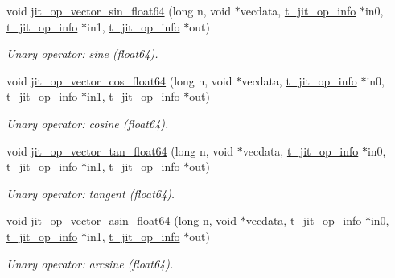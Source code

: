 \begin{DoxyCompactItemize}
void \hyperlink{group__opvecmod_ga12fa0c0f124217b6703c6f02bccee9d2}{jit\_\-op\_\-vector\_\-sin\_\-float64} (long n, void $\ast$vecdata, \hyperlink{structt__jit__op__info}{t\_\-jit\_\-op\_\-info} $\ast$in0, \hyperlink{structt__jit__op__info}{t\_\-jit\_\-op\_\-info} $\ast$in1, \hyperlink{structt__jit__op__info}{t\_\-jit\_\-op\_\-info} $\ast$out)
\begin{DoxyCompactList}\small\item\em Unary operator: sine (float64). \item\end{DoxyCompactList}\item 
void \hyperlink{group__opvecmod_ga2c87b24c84943232aa0dfdb15cf2ac4c}{jit\_\-op\_\-vector\_\-cos\_\-float64} (long n, void $\ast$vecdata, \hyperlink{structt__jit__op__info}{t\_\-jit\_\-op\_\-info} $\ast$in0, \hyperlink{structt__jit__op__info}{t\_\-jit\_\-op\_\-info} $\ast$in1, \hyperlink{structt__jit__op__info}{t\_\-jit\_\-op\_\-info} $\ast$out)
\begin{DoxyCompactList}\small\item\em Unary operator: cosine (float64). \item\end{DoxyCompactList}\item 
void \hyperlink{group__opvecmod_gac14fe8ff474f94a361a659cf9b6dca15}{jit\_\-op\_\-vector\_\-tan\_\-float64} (long n, void $\ast$vecdata, \hyperlink{structt__jit__op__info}{t\_\-jit\_\-op\_\-info} $\ast$in0, \hyperlink{structt__jit__op__info}{t\_\-jit\_\-op\_\-info} $\ast$in1, \hyperlink{structt__jit__op__info}{t\_\-jit\_\-op\_\-info} $\ast$out)
\begin{DoxyCompactList}\small\item\em Unary operator: tangent (float64). \item\end{DoxyCompactList}\item 
void \hyperlink{group__opvecmod_ga9a93eeba3437c85fdaeb1b43f208593e}{jit\_\-op\_\-vector\_\-asin\_\-float64} (long n, void $\ast$vecdata, \hyperlink{structt__jit__op__info}{t\_\-jit\_\-op\_\-info} $\ast$in0, \hyperlink{structt__jit__op__info}{t\_\-jit\_\-op\_\-info} $\ast$in1, \hyperlink{structt__jit__op__info}{t\_\-jit\_\-op\_\-info} $\ast$out)
\begin{DoxyCompactList}\small\item\em Unary operator: arcsine (float64). \item\end{DoxyCompactList}\item 

\end{DoxyCompactItemize}
